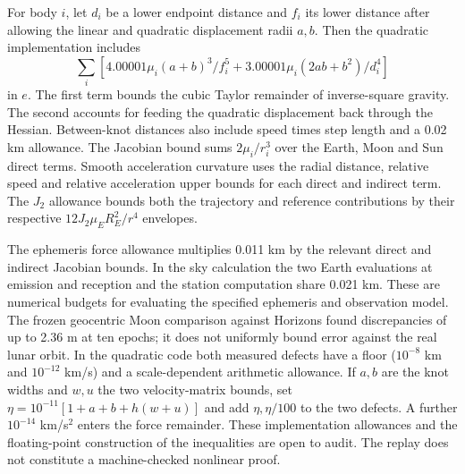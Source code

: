 \documentclass[10pt,letterpaper]{article}
\begin{document}
For body $i$, let $d_i$ be a lower endpoint distance and $f_i$ its lower distance after allowing the linear and quadratic displacement radii $a,b$. Then the quadratic implementation includes
\[
 \sum_i\left[4.00001\mu_i(a+b)^3/f_i^5+
      3.00001\mu_i(2ab+b^2)/d_i^4\right]
\]
in $e$. The first term bounds the cubic Taylor remainder of inverse-square gravity. The second accounts for feeding the quadratic displacement back through the Hessian. Between-knot distances also include speed times step length and a 0.02 km allowance. The Jacobian bound sums $2\mu_i/r_i^3$ over the Earth, Moon and Sun direct terms. Smooth acceleration curvature uses the radial distance, relative speed and relative acceleration upper bounds for each direct and indirect term. The $J_2$ allowance bounds both the trajectory and reference contributions by their respective $12J_2\mu_E R_E^2/r^4$ envelopes.

The ephemeris force allowance multiplies 0.011 km by the relevant direct and indirect Jacobian bounds. In the sky calculation the two Earth evaluations at emission and reception and the station computation share 0.021 km. These are numerical budgets for evaluating the specified ephemeris and observation model. The frozen geocentric Moon comparison against Horizons found discrepancies of up to 2.36 m at ten epochs; it does not uniformly bound error against the real lunar orbit. In the quadratic code both measured defects have a floor ($10^{-8}$ km and $10^{-12}$ km/s) and a scale-dependent arithmetic allowance. If $a,b$ are the knot widths and $w,u$ the two velocity-matrix bounds, set $\eta=10^{-11}[1+a+b+h(w+u)]$ and add $\eta,\eta/100$ to the two defects. A further $10^{-14}$ km/s$^2$ enters the force remainder. These implementation allowances and the floating-point construction of the inequalities are open to audit. The replay does not constitute a machine-checked nonlinear proof.
\end{document}
